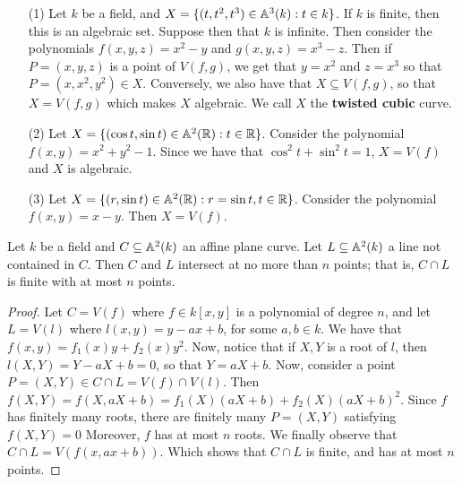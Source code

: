 \begin{example}\label{example_1.6}
    \begin{enumerate}

        \item[(1)] Let $k$ be a field, and  $X=\{(t,t^2,t^3) \in \mathbb{A}^3(k) : t \in
          k\}$. If $k$ is finite, then this is an algebraic set. Suppose then
          that  $k$ is infinite. Then consider the polynomials  $f(x,y,z)=x^2-y$
          and $g(x,y,z)=x^3-z$. Then if $P=(x,y,z)$ is a point of $V(f,g)$, we
          get that  $y=x^2$ and  $z=x^3$ so that  $P=(x,x^2,y^2) \in X$.
          Conversely, we also have that $X \subseteq V(f,g)$, so that $X=V(f,g)$
          which makes $X$ algebraic. We call $X$ the \textbf{twisted cubic}
          curve.

        \item[(2)] Let $X=\{(\cos{t},\sin{t}) \in \mathbb{A}^2(\mathbb{R}) : t \in \mathbb{R}\}$.
            Consider the polynomial $f(x,y)=x^2+y^2-1$. Since we have that
            $\cos^2{t}+\sin^2{t}=1$, $X=V(f)$ and $X$ is algebraic.

        \item[(3)] Let $X=\{(r,\sin{t}) \in \mathbb{A}^2(\mathbb{R}) : r=\sin{t}, t \in \mathbb{R} \}$.
            Consider the polynomial $f(x,y)=x-y$. Then $X=V(f)$.
    \end{enumerate}
\end{example}

\begin{lemma}\label{1.2.2}
    Let $k$ be a field and  $C \subseteq \mathbb{A}^2(k)$ an affine plane curve. Let $L
    \subseteq \mathbb{A}^2(k)$ a line not contained in $C$. Then $C$ and $L$ intersect
    at no more than $n$ points; that is, $C \cap L$ is finite
    with at most $n$ points.
\end{lemma}
\begin{proof}
    Let $C=V(f)$ where $f \in k[x,y]$ is a polynomial of degree $n$, and let
    $L=V(l)$ where $l(x,y)=y-ax+b$, for some $a,b \in k$. We have that
    $f(x,y)=f_1(x)y+f_2(x)y^2$. Now, notice that if $X,Y$ is a root of $l$, then
    $l(X,Y)=Y-aX+b=0$, so that $Y=aX+b$. Now, consider a point $P=(X,Y) \in C
    \cap L=V(f) \cap V(l)$. Then $f(X,Y)=f(X,aX+b)=f_1(X)(aX+b)+f_2(X)(aX+b)^2$.
    Since $f$ has finitely many roots, there are finitely many $P=(X,Y)$
    satisfying $f(X,Y)=0$ Moreover,  $f$ has at most $n$ roots. We finally
    observe that $C \cap L=V(f(x,ax+b))$. Which shows that $C \cap L$ is finite,
    and has at most $n$ points.
\end{proof}

